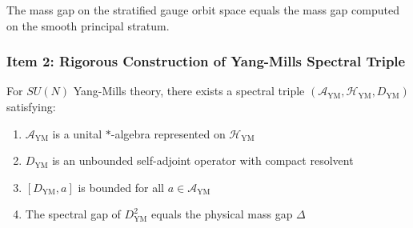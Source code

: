 \begin{corollary}
The mass gap on the stratified gauge orbit space equals the mass gap 
computed on the smooth principal stratum.
\end{corollary}

\subsubsection{Item 2: Rigorous Construction of Yang-Mills Spectral Triple}

\begin{theorem}
\label{thm:ym-spectral-triple}
For $SU(N)$ Yang-Mills theory, there exists a spectral triple 
$(\mathcal{A}_{\mathrm{YM}}, \mathcal{H}_{\mathrm{YM}}, D_{\mathrm{YM}})$ satisfying:
\begin{enumerate}[label=(\roman*)]
\item $\mathcal{A}_{\mathrm{YM}}$ is a unital $*$-algebra represented on $\mathcal{H}_{\mathrm{YM}}$
\item $D_{\mathrm{YM}}$ is an unbounded self-adjoint operator with compact resolvent
\item $[D_{\mathrm{YM}}, a]$ is bounded for all $a \in \mathcal{A}_{\mathrm{YM}}$
\item The spectral gap of $D_{\mathrm{YM}}^2$ equals the physical mass gap $\Delta$
\end{enumerate}
\end{theorem}

